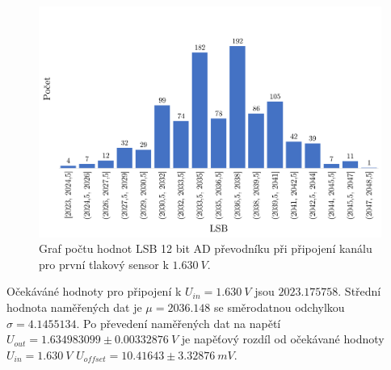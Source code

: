 \begin{figure}[H]
    \caption{Graf počtu hodnot LSB 12 bit AD převodníku při připojení kanálu pro první tlakový sensor k $1.630 \ V$.}
    \label{fig:hist_vacuum1_1_6}
    \includegraphics[width=1\textwidth]{graphs/vacuum1_16.png}

\end{figure}

Očekáváné hodnoty pro připojení k $U_{in} = 1.630 \ V$ jsou $2023.175758$. Střední hodnota naměřených dat je $\mu = 2036.148$ se směrodatnou odchylkou $\sigma = 4.1455134$. Po převedení naměřených dat na napětí $U_{out} = 1.634983099 \pm 0.00332876 \ V$ je napěťový rozdíl od očekávané hodnoty $U_{in} = 1.630 \ V$
$U_{offset} = 10.41643 \pm 3.32876 \ mV$.

